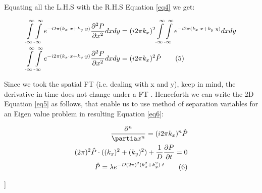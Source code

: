 \begin{@twocolumnfalse}
Equating all the L.H.S with the R.H.S Equation \eqref{eq4} we get: 

\begin{align}  
\int\limits^{\infty}_{\text{-}\infty}\int\limits^{\infty}_{\text{-}\infty} e^{-i 2\pi (k_x \cdot x + k_y \cdot y )} \frac{\partial^2 P}{\partial x^2} dx dy &= (i 2\pi k_x)^2 \int\limits^{\infty}_{\text{-}\infty}\int\limits^{\infty}_{\text{-}\infty} e^{-i 2\pi (k_x \cdot x + k_y \cdot y )} dx dy \\
\int\limits^{\infty}_{\text{-}\infty}\int\limits^{\infty}_{\text{-}\infty} e^{-i 2\pi (k_x \cdot x + k_y \cdot y )} \frac{\partial^2 P}{\partial x^2} dx dy &= (i 2\pi k_x)^2 \hat{P} \tag{5}
\label{eq5}  
\end{align} 

Since we took the spatial FT (i.e. dealing with x and y), keep in mind, the derivative in time does not change under a FT \cite{TANG2022186}. Henceforth we can write the 2D Equation \eqref{eq5} as follows, that enable us to use method of separation variables for an Eigen value problem in resulting Equation \eqref{eq6}: 

    \begin{align*}
    \frac{\partial^n}{\partia x^n} = (i 2\pi k_x)^n \hat{P} \\
    (2\pi)^2 \hat{P} \cdot ((k_x)^2 + (k_y)^2)  + \frac{1}{D} \frac{\partial P}{ \partial t}=0\\
    \hat{P} = \lambda e^{-D (2\pi)^2 (k_x^2 + k_y^2) \cdot t} \tag{6}
    \label{eq6}   
    \end{align*}    

\end{@twocolumnfalse}]
